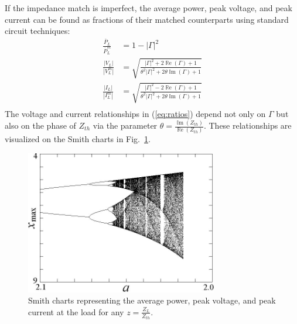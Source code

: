 \documentclass{ifacconf}
\renewcommand{\Re}{\operatorname{\mathbb{R}e}}
\renewcommand{\Im}{\operatorname{\mathbb{I}m}}
\begin{document}
If the impedance match is imperfect, the average power, peak voltage, and peak current can be found as fractions of their matched counterparts using standard circuit techniques:
\begin{equation}\label{eq:ratios}
\begin{aligned}
     \frac{\overline{P}_L}{\overline{P}_L^m} &= 1 - |\Gamma|^2\\
     \frac{|V_L|}{|V_L^m|} &= \sqrt{\frac{|\Gamma|^2 + 2 \Re(\Gamma) + 1}{\theta^2 |\Gamma|^2 + 2 \theta \Im(\Gamma) + 1} } \\
     \frac{|I_L|}{|I_L^m|} &= \sqrt{\frac{|\Gamma|^2 - 2 \Re(\Gamma) + 1}{\theta^2 |\Gamma|^2 + 2 \theta \Im(\Gamma) + 1} }\\
\end{aligned}
\end{equation}
The voltage and current relationships in (\ref{eq:ratios}) depend not only on $\Gamma$ but also on the phase of $Z_{th}$ via the parameter $\theta = \frac{\Im(Z_{th})}{\Re(Z_{th})}$. These relationships are visualized on the Smith charts in Fig.~\ref{fig:power-smith}.

\begin{figure}
\begin{center}
\includegraphics[width=8.4cm]{bifurcation}    %
\caption{Smith charts representing the average power, peak voltage, and peak current at the load for any $z=\frac{Z_L}{Z_{th}}$.} 
\label{fig:power-smith}
\end{center}
\end{figure}
\end{document}
